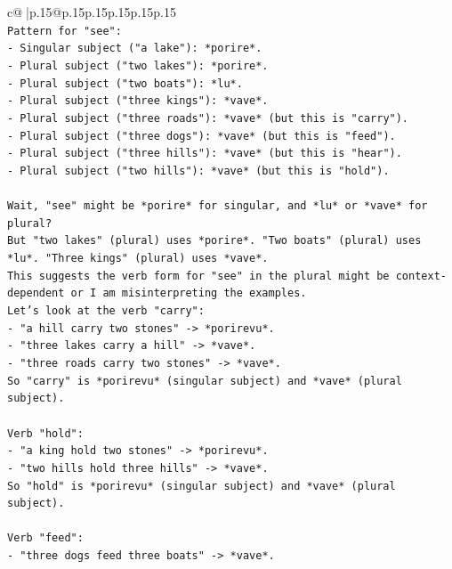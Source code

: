 \documentclass{article}
\begin{document}
{\begin{supertabular}{c@{$\;$}|p{.15\linewidth}@{}p{.15\linewidth}p{.15\linewidth}p{.15\linewidth}p{.15\linewidth}p{.15\linewidth}}
{{{\\ 
\texttt{Pattern for "see":} \\
\texttt{{-} Singular subject ("a lake"): *porire*.} \\
\texttt{{-} Plural subject ("two lakes"): *porire*.} \\
\texttt{{-} Plural subject ("two boats"): *lu*.} \\
\texttt{{-} Plural subject ("three kings"): *vave*.} \\
\texttt{{-} Plural subject ("three roads"): *vave* (but this is "carry").} \\
\texttt{{-} Plural subject ("three dogs"): *vave* (but this is "feed").} \\
\texttt{{-} Plural subject ("three hills"): *vave* (but this is "hear").} \\
\texttt{{-} Plural subject ("two hills"): *vave* (but this is "hold").} \\
\\ 
\texttt{Wait, "see" might be *porire* for singular, and *lu* or *vave* for plural?} \\
\texttt{But "two lakes" (plural) uses *porire*. "Two boats" (plural) uses *lu*. "Three kings" (plural) uses *vave*.} \\
\texttt{This suggests the verb form for "see" in the plural might be context{-}dependent or I am misinterpreting the examples.} \\
\texttt{Let's look at the verb "carry":} \\
\texttt{{-} "a hill carry two stones" {-}> *porirevu*.} \\
\texttt{{-} "three lakes carry a hill" {-}> *vave*.} \\
\texttt{{-} "three roads carry two stones" {-}> *vave*.} \\
\texttt{So "carry" is *porirevu* (singular subject) and *vave* (plural subject).} \\
\\ 
\texttt{Verb "hold":} \\
\texttt{{-} "a king hold two stones" {-}> *porirevu*.} \\
\texttt{{-} "two hills hold three hills" {-}> *vave*.} \\
\texttt{So "hold" is *porirevu* (singular subject) and *vave* (plural subject).} \\
\\ 
\texttt{Verb "feed":} \\
\texttt{{-} "three dogs feed three boats" {-}> *vave*.} \\
}}}
\end{supertabular}}
\end{document}
